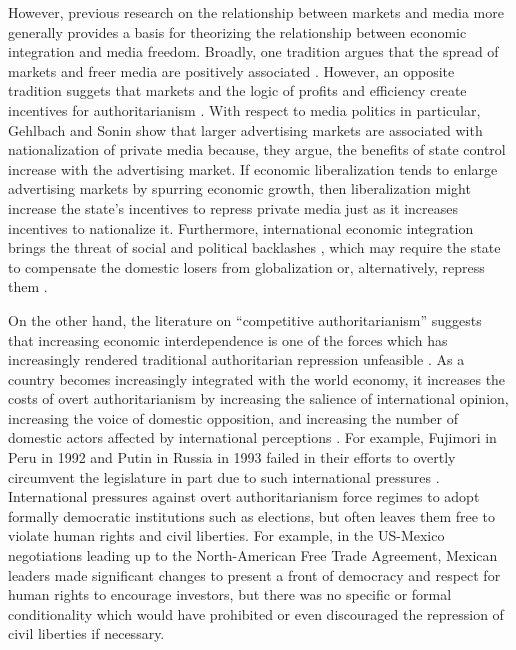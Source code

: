 \documentclass[12pt,a4paper]{article}\usepackage[]{graphicx}\usepackage[]{color}
\begin{document}
However, previous research on the relationship between markets and media more generally provides a basis for theorizing the relationship between economic integration and media freedom. Broadly, one tradition argues that the spread of markets and freer media are positively associated \parencites{Habermas:1991vg}{Islam:2002uc}{Islam:2003tu}. However, an opposite tradition suggets that markets and the logic of profits and efficiency create incentives for authoritarianism \parencite{Huntington:1975vt}. With respect to media politics in particular, Gehlbach and Sonin \parencite*{Gehlbach:2011ky} show that larger advertising markets are associated with nationalization of private media because, they argue, the benefits of state control increase with the advertising market. If economic liberalization tends to enlarge advertising markets by spurring economic growth, then liberalization might increase the state's incentives to repress private media just as it increases incentives to nationalize it. Furthermore, international economic integration brings the threat of social and political backlashes \parencite{Bussmann:2007vx}, which may require the state to compensate the domestic losers from globalization \parencite{Rodrik:1998te} or, alternatively, repress them \parencite{Adsera:2002vt}.

On the other hand, the literature on ``competitive authoritarianism'' suggests that increasing economic interdependence is one of the forces which has increasingly rendered traditional authoritarian repression unfeasible \parencite[60, 62]{Levitsky:2002gx}. As a country becomes increasingly integrated with the world economy, it increases the costs of overt authoritarianism by increasing the salience of international opinion, increasing the voice of domestic opposition, and increasing the number of domestic actors affected by international perceptions \parencite{Levitsky:2006ex}. For example, Fujimori in Peru in 1992 and Putin in Russia in 1993 failed in their efforts to overtly circumvent the legislature in part due to such international pressures \parencite[56]{Levitsky:2002gx}. International pressures against overt authoritarianism force regimes to adopt formally democratic institutions such as elections, but often leaves them free to violate human rights and civil liberties. For example, in the US-Mexico negotiations leading up to the North-American Free Trade Agreement, Mexican leaders made significant changes to present a front of democracy and respect for human rights to encourage investors, but there was no specific or formal conditionality which would have prohibited or even discouraged the repression of civil liberties if necessary.
\end{document}
